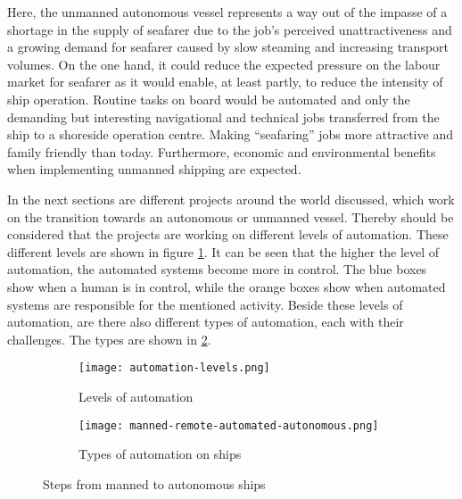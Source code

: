 Here, the unmanned autonomous vessel represents a way out of the impasse of a shortage in the supply of seafarer due to the job’s perceived unattractiveness and a growing demand for seafarer caused by slow steaming and increasing transport volumes. On the one hand, it could reduce the expected pressure on the labour market for seafarer as it would enable, at least partly, to reduce the intensity of ship operation. Routine tasks on board would be automated and only the demanding but interesting navigational and technical jobs transferred from the ship to a shoreside operation centre. Making “seafaring” jobs more attractive and family friendly than today. Furthermore, economic and environmental benefits when implementing unmanned shipping are expected. \cite{MUNIN2016}

In the next sections are different projects around the world discussed, which work on the transition towards an autonomous or unmanned vessel. Thereby should be considered that the projects are working on different levels of automation. These different levels are shown in figure \ref{fig:automation-levels}. It can be seen that the higher the level of automation, the automated systems become more in control. The blue boxes show when a human is in control, while the orange boxes show when automated systems are responsible for the mentioned activity. 
Beside these levels of automation, are there also different types of automation, each with their challenges. The types are shown in \ref{fig:manned-remote-autonomous}.

\begin{figure}[hb]
	\begin{subfigure}[b]{0.55\linewidth}
		\centering
		\texttt{[image: automation-levels.png]}
		\caption{Levels of automation}
		\label{fig:automation-levels}
	\end{subfigure} 
	\begin{subfigure}[b]{0.4\linewidth}
		\centering
		\texttt{[image: manned-remote-automated-autonomous.png]}
		\caption{Types of automation on ships}
		\label{fig:manned-remote-autonomous}
	\end{subfigure}
	\caption{Steps from manned to autonomous ships}
	\label{fig:automation} 
\end{figure}


